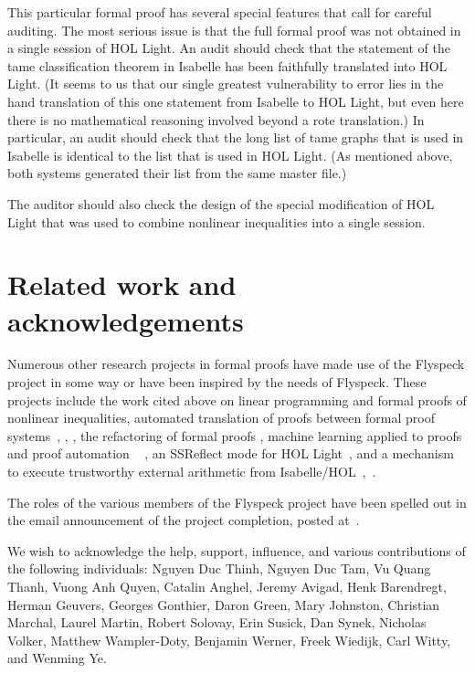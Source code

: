 This particular formal proof has several special features that call
for careful auditing.  The most serious issue is that the full formal
proof was not obtained in a single session of HOL Light.  An audit
should check that the statement of the tame classification theorem in
Isabelle has been faithfully translated into HOL Light.  (It seems to
us that our single greatest vulnerability to error lies in the hand
translation of this one statement from Isabelle to HOL Light, but even
here there is no mathematical reasoning involved beyond a rote
translation.)  In particular, an audit should check that the long list
of tame graphs that is used in Isabelle is identical to the list that
is used in HOL Light.  (As mentioned above, both systems generated
their list from the same master file.)
  
The auditor should also check the design of the special modification
of HOL Light that was used to combine nonlinear inequalities into a
single session.


\section{Related work and acknowledgements}

Numerous other research projects in formal proofs have made use of the
Flyspeck project in some way or have been inspired by the needs of
Flyspeck.  These projects include the work cited above on linear
programming and formal proofs of nonlinear inequalities, automated
translation of proofs between formal proof systems~\cite{obua:import},
\cite{KaliszykK13}, \cite{McLaughlin:2006:IJCAR}, the refactoring of
formal proofs \cite{adams2012recording}, machine learning applied to
proofs and proof automation ~\cite{KU14} \cite{KaliszykU2014}, an
SSReflect mode for HOL Light~\cite{Solovyev-thesis}, and a mechanism
to execute trustworthy external arithmetic from
Isabelle/HOL~\cite{obua:phd},~\cite{ObuaN}.


The roles of the
various members of the Flyspeck project have been spelled out in the email
announcement of the project completion, posted
at~\cite{website:FlyspeckProject}. 

We wish to acknowledge the help, support, influence, and various
contributions of the following individuals:
Nguyen Duc Thinh,  
Nguyen Duc Tam, 
Vu Quang Thanh,
Vuong Anh Quyen,
% 
Catalin Anghel, 
Jeremy Avigad, 
Henk Barendregt,
%
Herman Geuvers,
Georges Gonthier,
Daron Green,
Mary Johnston,
Christian Marchal,
Laurel %
Martin, 
%
Robert Solovay,
Erin Susick,
Dan Synek,
Nicholas Volker, 
Matthew Wampler-Doty, 
Benjamin Werner,
Freek Wiedijk, 
Carl Witty, and
Wenming Ye.

